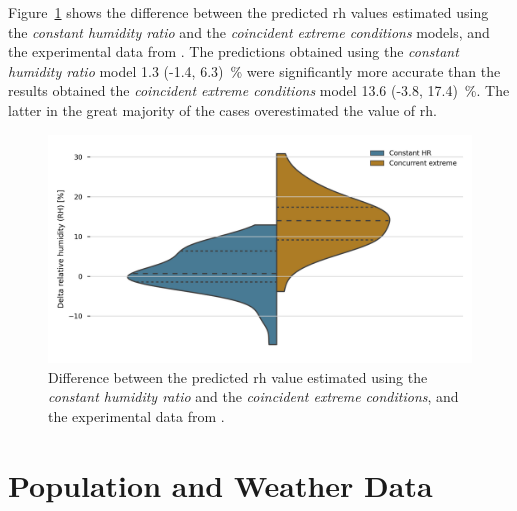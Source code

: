 Figure~\ref{fig:delta_rh} shows the difference between the predicted \ac{rh} values estimated using the \textit{constant humidity ratio} and the \textit{coincident extreme conditions} models, and the experimental data from .
The predictions obtained using the \textit{constant humidity ratio} model 1.3 (-1.4, 6.3)~\% were significantly more accurate than the results obtained the \textit{coincident extreme conditions} model 13.6 (-3.8, 17.4)~\%.
The latter in the great majority of the cases overestimated the value of \ac{rh}.

\begin{figure}[h]
    \centering
    \includegraphics[width=\textwidth]{figures/delta_rh}
    \caption{Difference between the predicted \ac{rh} value estimated using the \textit{constant humidity ratio} and the \textit{coincident extreme conditions}, and the experimental data from .}
    \label{fig:delta_rh}
\end{figure}

\section{Population and Weather Data}\label{sec:pop_weather}



\clearpage